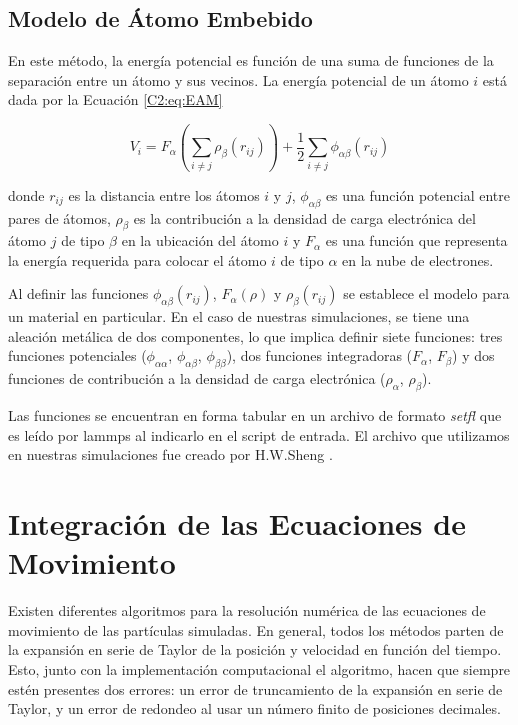 \subsection{Modelo de Átomo Embebido}
\label{SS2_3_2}

En este método, la energía potencial es función de una suma de funciones de la separación entre un átomo y sus vecinos. La energía potencial de un átomo $i$ está dada por la Ecuación \ref{C2:eq:EAM}

\begin{equation}
V_{i} = F_{\alpha}\left(\sum_{i\neq j} \rho_{\beta} (r_{ij}) \right) + \frac{1}{2} \sum_{i\neq j} \phi_{\alpha\beta}(r_{ij})
\label{C2:eq:EAM}
\end{equation}

donde $r_{ij}$ es la distancia entre los átomos $i$ y $j$, $\phi_{\alpha\beta}$ es una función potencial entre pares de átomos, $\rho_{\beta}$ es la contribución a la densidad de carga electrónica del átomo $j$ de tipo $\beta$ en la ubicación del átomo $i$ y $F_{\alpha}$ es una función que representa la energía requerida para colocar el átomo $i$ de tipo $\alpha$ en la nube de electrones.

Al definir las funciones $\phi_{\alpha\beta}(r_{ij})$, $F_{\alpha}(\rho)$ y $\rho_{\beta} (r_{ij})$ se establece el modelo para un material en particular. En el caso de nuestras simulaciones, se tiene una aleación metálica de dos componentes, lo que implica definir siete funciones: tres funciones potenciales ($\phi_{\alpha\alpha}$, $\phi_{\alpha\beta}$, $\phi_{\beta\beta}$), dos funciones integradoras ($F_{\alpha}$, $F_{\beta}$) y dos funciones de contribución a la densidad de carga electrónica ($\rho_{\alpha}$, $\rho_{\beta}$).

Las funciones se encuentran en forma tabular en un archivo de formato \textit{setfl} \citep{setfl} que es leído por lammps al indicarlo en el script de entrada. El archivo que utilizamos en nuestras simulaciones fue creado por H.W.Sheng \citep{cheng09}.

\section{Integración de las Ecuaciones de Movimiento}
\label{S2_4}

Existen diferentes algoritmos para la resolución numérica de las ecuaciones de movimiento de las partículas simuladas. En general, todos los métodos parten de la expansión en serie de Taylor de la posición y velocidad en función del tiempo. Esto, junto con la implementación computacional el algoritmo, hacen que siempre estén presentes dos errores: un error de truncamiento de la expansión en serie de Taylor, y un error de redondeo al usar un número finito de posiciones decimales.

